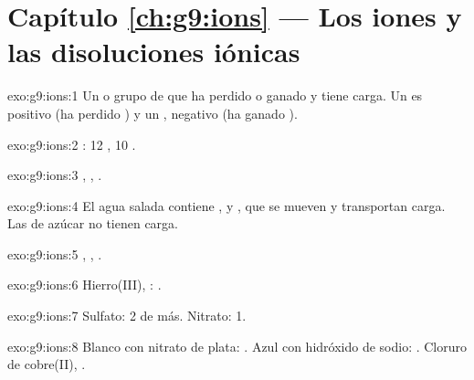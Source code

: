 \section*{Capítulo \ref{ch:g9:ions} --- Los iones y las disoluciones iónicas}

\begin{solution}{exo:g9:ions:1}
Un  o grupo de  que ha perdido o ganado  y tiene
carga. Un  es positivo (ha perdido ) y un ,
negativo (ha ganado ).
\end{solution}

\begin{solution}{exo:g9:ions:2}
: 12 , 10 .
\end{solution}

\begin{solution}{exo:g9:ions:3}
, , .
\end{solution}

\begin{solution}{exo:g9:ions:4}
El agua salada contiene ,  y , que se
mueven y transportan carga. Las  de azúcar no tienen carga.
\end{solution}

\begin{solution}{exo:g9:ions:5}
, , .
\end{solution}

\begin{solution}{exo:g9:ions:6}
Hierro(III), : .
\end{solution}

\begin{solution}{exo:g9:ions:7}
Sulfato: 2  de más. Nitrato: 1.
\end{solution}

\begin{solution}{exo:g9:ions:8}
Blanco con nitrato de plata: . Azul con hidróxido de sodio:
. Cloruro de cobre(II), .
\end{solution}

